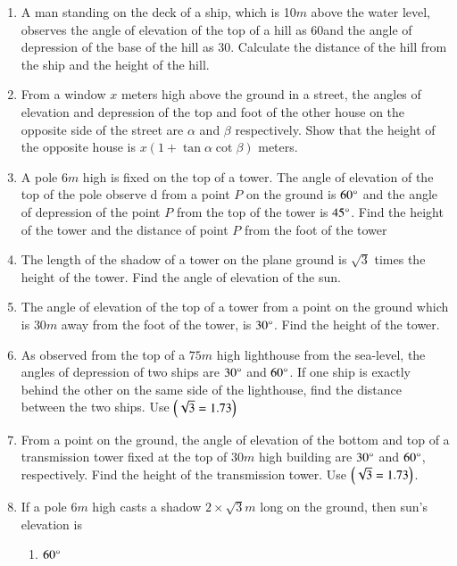 \begin{enumerate}[label=\thesubsection.\arabic*.,ref=\thesubsection.\theenumi]
\hfill{}
%
\item A man standing on the deck of a ship, which is 10$m$ above the water level, observes the
angle of elevation of the top of a hill as 60\degree and the angle of depression of the base of the hill as
30\degree. Calculate the distance of the hill from the ship and the height of the hill.
%
\hfill{}\item From a window $x$ meters high above the ground in a street, the angles of elevation and depression of the top and foot of the other house on the opposite side of the street are $\alpha$ and $\beta$ respectively. Show that the height of the opposite house is $x(1 + \tan \alpha \cot \beta)$ meters.
%
\hfill{}
%
\item A pole $6m$ high is fixed on the top of a tower. The angle of elevation of the top of the pole observe
d from a point $P$ on the ground is $60\degree$ and the angle of depression of the point $P$ from the top of
 the tower is $45\degree$. Find the height of the tower and the distance of point $P$ from the foot of the tower
\hfill{}
%
\item The length of the shadow of a tower on the plane ground is $ \sqrt3 $ times the height of the tower. Find the angle of elevation of the sun.
%
\hfill{}\item The angle of elevation of the top of a tower from a point on the ground which is $30 {m}$ away from the foot of the tower, is $30\degree$. Find the height of the tower. 
\hfill{}
%
\item As observed from the top of a $75{m}$ high lighthouse from the sea-level, the angles of depression of two ships are $30\degree$ and $60\degree$. If one ship is exactly behind the other on the same side of the lighthouse, find the distance between the two ships.
	Use $\left(\sqrt{3} = 1.73\right)$
%
\hfill{}\item From a point on the ground, the angle of elevation of the bottom and top of a transmission tower fixed at the top of $30 {m}$ high building are $30\degree$ and $60\degree$, respectively. Find the height of the transmission tower. Use $\left(\sqrt{3} = 1.73\right)$.
	\hfill{}\item If a pole  $6m$ high casts a shadow $2 \times \sqrt{3}m$ long on the ground, then sun's elevation is
	\begin{multicols}{4}
\begin{enumerate}
\item $60\degree$

\end{enumerate}
\end{multicols}
\end{enumerate}

